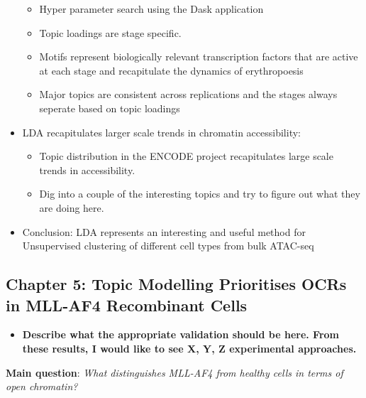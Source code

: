 \begin{itemize}
      \begin{itemize}
      \tightlist
      \item
        Hyper parameter search using the Dask application
      \item
        Topic loadings are stage specific.
      \item
        Motifs represent biologically relevant transcription factors that
        are active at each stage and recapitulate the dynamics of
        erythropoesis
      \item
        Major topics are consistent across replications and the stages
        always seperate based on topic loadings
      \end{itemize}
    \item
      LDA recapitulates larger scale trends in chromatin accessibility:
    
      \begin{itemize}
      \tightlist
      \item
        Topic distribution in the ENCODE project recapitulates large scale
        trends in accessibility.
      \item
        Dig into a couple of the interesting topics and try to figure out
        what they are doing here.
      \end{itemize}
    \item
      Conclusion: LDA represents an interesting and useful method for
      Unsupervised clustering of different cell types from bulk ATAC-seq
    \end{itemize}
    
    \hypertarget{chapter-5-topic-modelling-prioritises-ocrs-in-mll-af4-recombinant-cells}{%
    \subsection{Chapter 5: Topic Modelling Prioritises OCRs in MLL-AF4
    Recombinant
    Cells}\label{chapter-5-topic-modelling-prioritises-ocrs-in-mll-af4-recombinant-cells}}
    
    \begin{itemize}
    \tightlist
    \item
      \textbf{Describe what the appropriate validation should be here. From
      these results, I would like to see X, Y, Z experimental approaches.}
    \end{itemize}
    
    \textbf{Main question}: \emph{What distinguishes MLL-AF4 from healthy
    cells in terms of open chromatin?}
    
